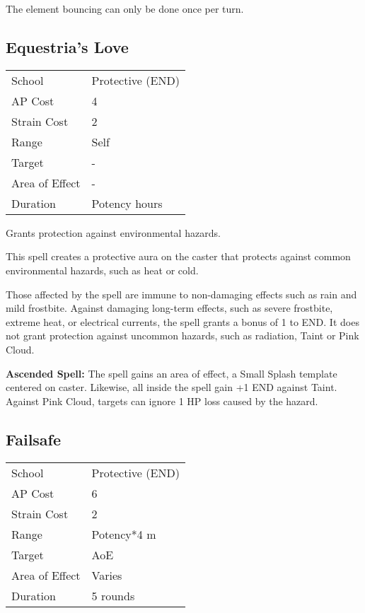 \documentclass[11pt,a4paper,twocolumn]{book}
\begin{document}
The element bouncing can only be done once per turn.


\subsection*{Equestria's Love}
{
	\begin{tabu} to 75mm{| X[l,4] | X[l,7] |}
		\hline
		School 			& Protective (END) 		\\
		AP Cost	      	& 4 					\\
		Strain Cost     & 2 					\\
		Range     		& Self					\\
		Target      	& -					\\
		Area of Effect  & -			\\
		Duration     	& Potency hours 	\\ \hline
	\end{tabu}
	
}

\medskip

Grants protection against environmental hazards.

This spell creates a protective aura on the caster that protects against common environmental hazards, such as heat or cold.

Those affected by the spell are immune to non-damaging effects such as rain and mild frostbite. Against damaging long-term effects, such as severe frostbite, extreme heat, or electrical currents, the spell grants a bonus of 1 to END. It does not grant protection against uncommon hazards, such as radiation, Taint or Pink Cloud.

\bigskip

\textbf{Ascended Spell:} The spell gains an area of effect, a Small Splash template centered on caster. Likewise, all inside the spell gain +1 END against Taint. Against Pink Cloud, targets can ignore 1 HP loss caused by the hazard.

\vfill

\subsection*{Failsafe}
{
	\begin{tabu} to 75mm{| X[l,4] | X[l,7] |}
		\hline
		School 			& Protective (END)		\\
		AP Cost	      	& 6 					\\
		Strain Cost     & 2 					\\
		Range     		& Potency*4 m 			\\
		Target      	& AoE					\\
		Area of Effect  & Varies  	 		\\
		Duration     	& 5 rounds 				\\ \hline
	\end{tabu}
	
}
\end{document}

